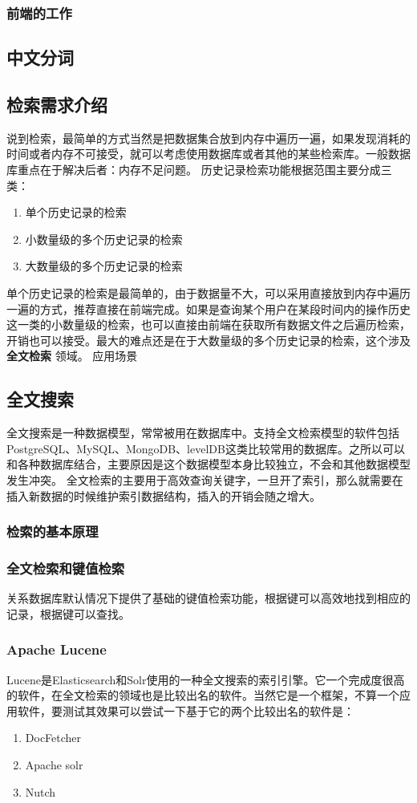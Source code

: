 \documentclass[fontset=windows,11pt]{ctexart}
\begin{document}
\subsubsection{前端的工作}
\label{sec-3-1-3}
\subsection{中文分词}
\label{sec-3-2}
\subsection{检索需求介绍}
\label{sec-3-3}
说到检索，最简单的方式当然是把数据集合放到内存中遍历一遍，如果发现消耗的时间或者内存不可接受，就可以考虑使用数据库或者其他的某些检索库。一般数据库重点在于解决后者：内存不足问题。
历史记录检索功能根据范围主要分成三类：
\begin{enumerate}
\item 单个历史记录的检索
\item 小数量级的多个历史记录的检索
\item 大数量级的多个历史记录的检索
\end{enumerate}

单个历史记录的检索是最简单的，由于数据量不大，可以采用直接放到内存中遍历一遍的方式，推荐直接在前端完成。如果是查询某个用户在某段时间内的操作历史这一类的小数量级的检索，也可以直接由前端在获取所有数据文件之后遍历检索，开销也可以接受。最大的难点还是在于大数量级的多个历史记录的检索，这个涉及 \textbf{全文检索} 领域。
应用场景
\subsection{全文搜索}
\label{sec-3-4}
全文搜索是一种数据模型，常常被用在数据库中。支持全文检索模型的软件包括PostgreSQL、MySQL、MongoDB、levelDB这类比较常用的数据库。之所以可以和各种数据库结合，主要原因是这个数据模型本身比较独立，不会和其他数据模型发生冲突。
全文检索的主要用于高效查询关键字，一旦开了索引，那么就需要在插入新数据的时候维护索引数据结构，插入的开销会随之增大。
\subsubsection{检索的基本原理}
\label{sec-3-4-1}
\subsubsection{全文检索和键值检索}
\label{sec-3-4-2}
关系数据库默认情况下提供了基础的键值检索功能，根据键可以高效地找到相应的记录，根据键可以查找。
\subsubsection{Apache Lucene}
\label{sec-3-4-3}
Lucene是Elasticsearch和Solr使用的一种全文搜索的索引引擎。它一个完成度很高的软件，在全文检索的领域也是比较出名的软件。当然它是一个框架，不算一个应用软件，要测试其效果可以尝试一下基于它的两个比较出名的软件是：
\begin{enumerate}
\item DocFetcher
\item Apache solr
\item Nutch
\end{enumerate}
\end{document}
